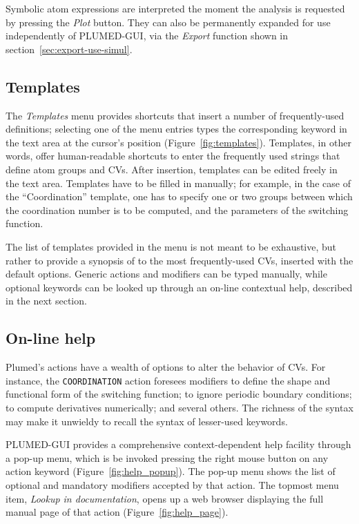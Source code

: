 \documentclass[preprint,12pt]{elsarticle}
\begin{document}
Symbolic atom expressions are interpreted the moment the analysis is
requested by pressing the \emph{Plot} button. They can also be
permanently expanded for use independently of PLUMED-GUI, via the
\emph{Export} function shown in section~\ref{sec:export-use-simul}.



\subsection{Templates}

The \emph{Templates} menu provides shortcuts that insert a number of
frequently-used definitions; selecting one of the menu entries types
the corresponding keyword in the text area at the cursor's position
(Figure~\ref{fig:templates}). Templates, in other words, offer
human-readable shortcuts to enter the frequently used strings that
define atom groups and CVs. After insertion, templates can be edited
freely in the text area.
Templates have to be filled in  manually; for example, in the
case of the ``Coordination'' template, one has to specify one or two
groups between which the coordination number is to be computed, and
the parameters of the switching function.

The list of templates provided in the menu is not meant to be
exhaustive, but rather to provide a synopsis of to the most
frequently-used CVs, inserted with the default options. Generic
actions and modifiers can be typed manually, while optional keywords
can be looked up through an on-line contextual help, described
in the next section.


\subsection{On-line help}

Plumed's actions have a wealth of options to alter the
behavior of CVs. For instance, the \texttt{COORDINATION} action
foresees modifiers to define the shape and functional form of the
switching function; to ignore periodic boundary conditions; to compute
derivatives numerically; and several others. The richness of the
syntax may make it unwieldy to recall the syntax of lesser-used
keywords.


PLUMED-GUI provides a comprehensive context-dependent help facility
through a pop-up menu, which is be invoked pressing the right mouse
button on any action keyword (Figure~\ref{fig:help_popup}). The pop-up
menu shows the list of optional and mandatory modifiers accepted by
that action.  The topmost menu item, \emph{Lookup in documentation},
opens up a web browser  displaying the full manual page of that action
(Figure~\ref{fig:help_page}).
\end{document}
